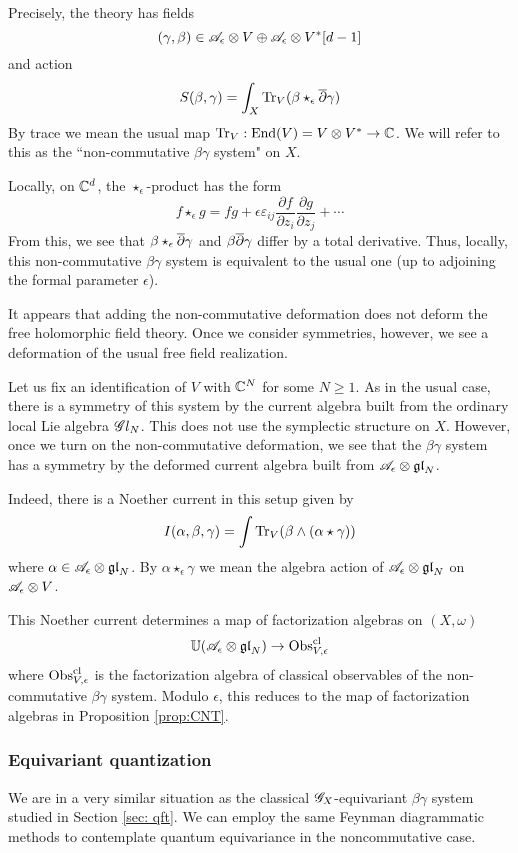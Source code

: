 Precisely, the theory has fields 
\[
(\gamma, \beta) \in \mathscr A_\epsilon \otimes V \oplus \mathscr A_\epsilon \otimes V^* [d-1] 
\]
and action 
\[
S(\beta,\gamma) = \int_X {\rm Tr}_V(\beta \star_{\epsilon} \overline{\partial} \gamma)
\]
By trace we mean the usual map ${\rm Tr}_V : {\rm End}(V) = V \otimes V^* \to \mathbb C$. 
We will refer to this as the ``non-commutative $\beta\gamma$ system" on $X$.

Locally, on $\mathbb C^d$, the $\star_{\epsilon}$-product has the form
\[
f \star_{\epsilon} g = fg + \epsilon \varepsilon_{ij} \frac{\partial f}{\partial z_i} \frac{\partial g}{\partial z_j} + \cdots
\]
From this, we see that $\beta \star_{\epsilon} \overline{\partial} \gamma$ and $\beta \overline{\partial} \gamma$ differ by a total derivative. 
Thus, locally, this non-commutative $\beta\gamma$ system is equivalent to the usual one (up to adjoining the formal parameter $\epsilon$).

It appears that adding the non-commutative deformation does not deform the free holomorphic field theory. 
Once we consider symmetries, however, we see a deformation of the usual free field realization. 

Let us fix an identification of $V$ with $\mathbb C^N$ for some $N \geq 1$. 
As in the usual case, there is a symmetry of this system by the current algebra built from the ordinary local Lie algebra $\mathscr G l_N$. 
This does not use the symplectic structure on $X$. 
However, once we turn on the non-commutative deformation, we see that the $\beta\gamma$ system has a symmetry by the deformed current algebra built from $\mathscr A_\epsilon \otimes {\mathfrak{gl}}_N$. 

Indeed, there is a Noether current in this setup given by
\[
I (\alpha, \beta,\gamma) = \int {\rm Tr}_{V}(\beta \wedge (\alpha \star \gamma)) 
\]
where $\alpha \in \mathscr A_\epsilon \otimes {\mathfrak{gl}}_N$.
By $\alpha \star_\epsilon \gamma$ we mean the algebra action of $\mathscr A_\epsilon \otimes {\mathfrak{gl}}_N$ on $\mathscr A_\epsilon \otimes V$. 

\begin{lem}
This Noether current determines a map of factorization algebras on $(X,\omega)$
\[
\mathbb U(\mathscr A_\epsilon \otimes {\mathfrak{gl}}_N) \to {\rm Obs}^{{\rm cl}}_{V,\epsilon}
\]
where ${\rm Obs}^{{\rm cl}}_{V,\epsilon}$ is the factorization algebra of classical observables of the non-commutative $\beta\gamma$ system.
Modulo $\epsilon$, this reduces to the map of factorization algebras in Proposition \ref{prop:CNT}.
\end{lem}

\subsubsection{Equivariant quantization}

We are in a very similar situation as the classical $\mathscr G_X$-equivariant $\beta\gamma$ system studied in Section \ref{sec: qft}.
We can employ the same Feynman diagrammatic methods to contemplate quantum equivariance in the noncommutative case.





